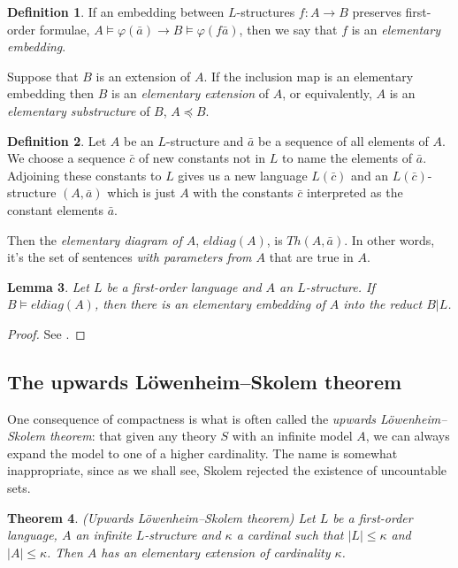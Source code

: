 \documentclass[10pt, a4paper, oneside]{article}
\newtheorem{thm}{Theorem}[section]
\theoremstyle{definition}
\newtheorem{dfn}[thm]{Definition}
\theoremstyle{remark}
\theoremstyle{plain}
\newtheorem{lem}[thm]{Lemma}
\theoremstyle{plain}
\begin{document}
\begin{dfn}
    If an embedding between $L$-structures $f : A \rightarrow B$ preserves
    first-order formulae, $A \models \varphi(\bar{a}) \rightarrow B \models
    \varphi(f\bar{a})$, then we say that $f$ is an \emph{elementary embedding}.
    
    Suppose that $B$ is an extension of $A$. If the inclusion map is an
    elementary embedding then $B$ is an \emph{elementary extension} of $A$, or
    equivalently, $A$ is an \emph{elementary substructure} of $B$, $A
    \preccurlyeq B$.
\end{dfn}

\begin{dfn}
    Let $A$ be an $L$-structure and $\bar{a}$ be a sequence of all elements of
    $A$. We choose a sequence $\bar{c}$ of new constants not in $L$ to name the
    elements of $\bar{a}$. Adjoining these constants to $L$ gives us a new
    language $L(\bar{c})$ and an $L(\bar{c})$-structure $(A, \bar{a})$ which is
    just $A$ with the constants $\bar{c}$ interpreted as the constant elements
    $\bar{a}$.
    
    Then the \emph{elementary diagram of $A$}, $eldiag(A)$, is $Th(A, \bar{a})$.
    In other words, it's the set of sentences \emph{with parameters from $A$}
    that are true in $A$.
\end{dfn}

\begin{lem}
    \label{eldiag_lem}
    Let $L$ be a first-order language and $A$ an $L$-structure. If $B \models
    eldiag(A)$, then there is an elementary embedding of $A$ into the reduct
    $B | L$.
\end{lem}

\begin{proof}
    See \citealt[p. 49]{hodges1997}.
\end{proof}

\subsection{The upwards Löwenheim--Skolem theorem}

One consequence of compactness is what is often called the \emph{upwards
Löwenheim--Skolem theorem}: that given any theory $S$ with an infinite model
$A$, we can always expand the model to one of a higher cardinality. The name is
somewhat inappropriate, since as we shall see, Skolem rejected the existence of
uncountable sets.

\begin{thm}
    \label{up_lst}
    (Upwards Löwenheim--Skolem theorem)
    Let $L$ be a first-order language, $A$ an infinite $L$-structure and
    $\kappa$ a cardinal such that $|L| \leq \kappa$ and $|A| \leq \kappa$. Then
    $A$ has an elementary extension of cardinality $\kappa$.
\end{thm}
\end{document}
